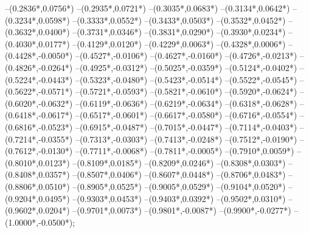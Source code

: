 {	--({0.2836*\xskala},{0.0756*\yskala})
	--({0.2935*\xskala},{0.0721*\yskala})
	--({0.3035*\xskala},{0.0683*\yskala})
	--({0.3134*\xskala},{0.0642*\yskala})
	--({0.3234*\xskala},{0.0598*\yskala})
	--({0.3333*\xskala},{0.0552*\yskala})
	--({0.3433*\xskala},{0.0503*\yskala})
	--({0.3532*\xskala},{0.0452*\yskala})
	--({0.3632*\xskala},{0.0400*\yskala})
	--({0.3731*\xskala},{0.0346*\yskala})
	--({0.3831*\xskala},{0.0290*\yskala})
	--({0.3930*\xskala},{0.0234*\yskala})
	--({0.4030*\xskala},{0.0177*\yskala})
	--({0.4129*\xskala},{0.0120*\yskala})
	--({0.4229*\xskala},{0.0063*\yskala})
	--({0.4328*\xskala},{0.0006*\yskala})
	--({0.4428*\xskala},{-0.0050*\yskala})
	--({0.4527*\xskala},{-0.0106*\yskala})
	--({0.4627*\xskala},{-0.0160*\yskala})
	--({0.4726*\xskala},{-0.0213*\yskala})
	--({0.4826*\xskala},{-0.0264*\yskala})
	--({0.4925*\xskala},{-0.0312*\yskala})
	--({0.5025*\xskala},{-0.0359*\yskala})
	--({0.5124*\xskala},{-0.0402*\yskala})
	--({0.5224*\xskala},{-0.0443*\yskala})
	--({0.5323*\xskala},{-0.0480*\yskala})
	--({0.5423*\xskala},{-0.0514*\yskala})
	--({0.5522*\xskala},{-0.0545*\yskala})
	--({0.5622*\xskala},{-0.0571*\yskala})
	--({0.5721*\xskala},{-0.0593*\yskala})
	--({0.5821*\xskala},{-0.0610*\yskala})
	--({0.5920*\xskala},{-0.0624*\yskala})
	--({0.6020*\xskala},{-0.0632*\yskala})
	--({0.6119*\xskala},{-0.0636*\yskala})
	--({0.6219*\xskala},{-0.0634*\yskala})
	--({0.6318*\xskala},{-0.0628*\yskala})
	--({0.6418*\xskala},{-0.0617*\yskala})
	--({0.6517*\xskala},{-0.0601*\yskala})
	--({0.6617*\xskala},{-0.0580*\yskala})
	--({0.6716*\xskala},{-0.0554*\yskala})
	--({0.6816*\xskala},{-0.0523*\yskala})
	--({0.6915*\xskala},{-0.0487*\yskala})
	--({0.7015*\xskala},{-0.0447*\yskala})
	--({0.7114*\xskala},{-0.0403*\yskala})
	--({0.7214*\xskala},{-0.0355*\yskala})
	--({0.7313*\xskala},{-0.0303*\yskala})
	--({0.7413*\xskala},{-0.0248*\yskala})
	--({0.7512*\xskala},{-0.0190*\yskala})
	--({0.7612*\xskala},{-0.0130*\yskala})
	--({0.7711*\xskala},{-0.0068*\yskala})
	--({0.7811*\xskala},{-0.0005*\yskala})
	--({0.7910*\xskala},{0.0059*\yskala})
	--({0.8010*\xskala},{0.0123*\yskala})
	--({0.8109*\xskala},{0.0185*\yskala})
	--({0.8209*\xskala},{0.0246*\yskala})
	--({0.8308*\xskala},{0.0303*\yskala})
	--({0.8408*\xskala},{0.0357*\yskala})
	--({0.8507*\xskala},{0.0406*\yskala})
	--({0.8607*\xskala},{0.0448*\yskala})
	--({0.8706*\xskala},{0.0483*\yskala})
	--({0.8806*\xskala},{0.0510*\yskala})
	--({0.8905*\xskala},{0.0525*\yskala})
	--({0.9005*\xskala},{0.0529*\yskala})
	--({0.9104*\xskala},{0.0520*\yskala})
	--({0.9204*\xskala},{0.0495*\yskala})
	--({0.9303*\xskala},{0.0453*\yskala})
	--({0.9403*\xskala},{0.0392*\yskala})
	--({0.9502*\xskala},{0.0310*\yskala})
	--({0.9602*\xskala},{0.0204*\yskala})
	--({0.9701*\xskala},{0.0073*\yskala})
	--({0.9801*\xskala},{-0.0087*\yskala})
	--({0.9900*\xskala},{-0.0277*\yskala})
	--({1.0000*\xskala},{-0.0500*\yskala});
}
